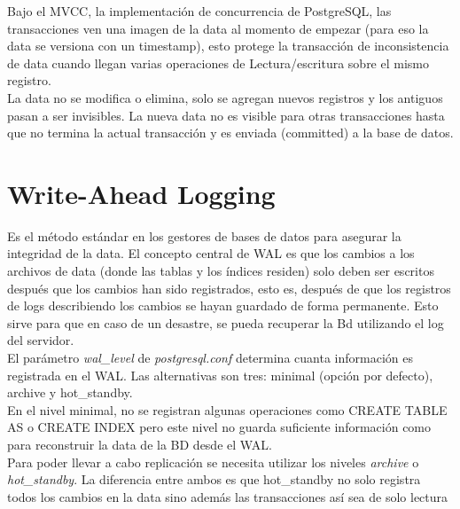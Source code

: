 Bajo el MVCC, la implementación de concurrencia de PostgreSQL, las transacciones ven una imagen de la data al momento de
empezar (para eso la data se versiona con un timestamp), esto protege la transacción de inconsistencia de data cuando llegan varias operaciones de Lectura/escritura sobre el mismo registro.\\

La data no se modifica o elimina, solo se agregan nuevos registros y los antiguos pasan a ser invisibles. La nueva data no es visible para otras transacciones hasta que no termina la actual transacción y es enviada (committed) a la base de datos.


\section{Write-Ahead Logging}

Es el método estándar en los gestores de bases de datos para asegurar la integridad de la data. El concepto central de WAL es que los cambios a los archivos de data (donde las tablas y los índices residen) solo deben ser escritos después que los cambios han sido registrados, esto es, después de que los registros de logs describiendo los cambios se hayan guardado de forma permanente. Esto sirve para que en caso de un desastre, se pueda recuperar la Bd utilizando el log del servidor.\\

El parámetro \textit{wal\_level} de \textit{postgresql.conf} determina cuanta información es registrada en el WAL. Las alternativas son tres: minimal (opción por defecto), archive y hot\_standby.\\

En el nivel minimal, no se registran algunas operaciones como CREATE TABLE AS o CREATE INDEX pero este nivel no guarda suficiente información como para reconstruir la data de la BD desde el WAL.\\

Para poder llevar a cabo replicación se necesita utilizar los niveles \textit{archive} o \textit{hot\_standby}. La diferencia entre ambos es que hot\_standby no solo registra todos los cambios en la data sino además las transacciones así sea de solo lectura

